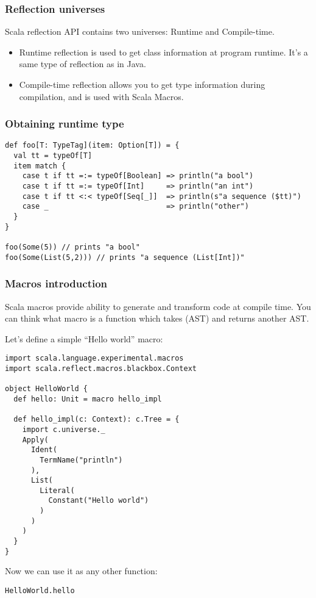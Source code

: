 \documentclass[t]{beamer}
\begin{document}
\begin{frame}[fragile]
\frametitle{Reflection universes}
Scala reflection API contains two universes: Runtime and Compile-time.

\begin{itemize}
\item Runtime reflection is used to get class information at program runtime. It's a same type of reflection as in Java.
\item Compile-time reflection allows you to get type information during compilation, and is used with Scala Macros.
\end{itemize}
\end{frame}

\begin{frame}[fragile]
\frametitle{Obtaining runtime type}
\begin{lstlisting}
def foo[T: TypeTag](item: Option[T]) = {
  val tt = typeOf[T]
  item match {
    case t if tt =:= typeOf[Boolean] => println("a bool")
    case t if tt =:= typeOf[Int]     => println("an int")
    case t if tt <:< typeOf[Seq[_]]  => println(s"a sequence ($tt)")
    case _                           => println("other")
  }
}

foo(Some(5)) // prints "a bool"
foo(Some(List(5,2))) // prints "a sequence (List[Int])"
\end{lstlisting}
\end{frame}

\begin{frame}[fragile]
\frametitle{Macros introduction}
Scala macros provide ability to generate and transform code at compile time.  You can think what macro is a function which
takes  (AST) and returns another AST.

Let's define a simple ``Hello world'' macro:

\begin{lstlisting}
import scala.language.experimental.macros
import scala.reflect.macros.blackbox.Context

object HelloWorld {
  def hello: Unit = macro hello_impl

  def hello_impl(c: Context): c.Tree = {
    import c.universe._
    Apply(
      Ident(
        TermName("println")
      ),
      List(
        Literal(
          Constant("Hello world")
        )
      )
    )
  }
}
\end{lstlisting}

Now we can use it as any other function:

\begin{lstlisting}
HelloWorld.hello
\end{lstlisting}

\end{frame}
\end{document}

